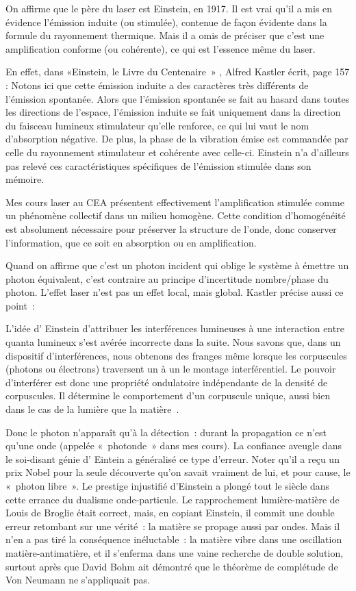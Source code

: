 \documentclass[a4paper,12pt]{article}
\begin{document}
On affirme que le père du laser est Einstein, en 1917. Il est vrai qu'il a mis en évidence l'émission induite (ou stimulée), contenue de façon évidente dans la formule du rayonnement thermique. Mais il a omis de préciser que c'est une amplification conforme (ou cohérente), ce qui est l'essence même du laser.

En effet, dans «Einstein, le Livre du Centenaire » \cite{French}, Alfred Kastler écrit, page 157 : Notons ici que cette émission induite a des caractères très différents de l'émission spontanée. Alors que l'émission spontanée se fait au hasard dans toutes les directions de l'espace, l'émission induite se fait uniquement dans la direction du faisceau lumineux stimulateur qu'elle renforce, ce qui lui vaut le nom d'absorption négative. De plus, la phase de la vibration émise est commandée par celle du rayonnement stimulateur et cohérente avec celle-ci. Einstein n'a d'ailleurs pas relevé ces caractéristiques spécifiques de l'émission stimulée dans son mémoire.

Mes cours laser au CEA présentent effectivement l'amplification stimulée comme un phénomène collectif dans un milieu homogène. Cette condition d'homogénéité est absolument nécessaire pour préserver la structure de l'onde, donc conserver l'information, que ce soit en absorption ou en amplification.

Quand on affirme que c'est un photon incident qui oblige le système à émettre un photon équivalent, c'est contraire au principe d'incertitude nombre/phase du photon. L'effet laser n'est pas un effet local, mais global. Kastler précise aussi ce point :

L'idée d' Einstein d'attribuer les interférences lumineuses à une interaction entre quanta lumineux s'est avérée incorrecte dans la suite. Nous savons que, dans un dispositif d'interférences, nous obtenons des franges même lorsque les corpuscules (photons ou électrons) traversent un à un le montage interférentiel. Le pouvoir d'interférer est donc une propriété ondulatoire indépendante de la densité de corpuscules. Il détermine le comportement d'un corpuscule unique, aussi bien dans le cas de la lumière que la matière .

Donc le photon n'apparaît qu'à la détection : durant la propagation ce n'est qu'une onde (appelée « photonde » dans mes cours). La confiance aveugle dans le soi-disant génie d' Eintein a généralisé ce type d'erreur. Noter qu'il a reçu un prix Nobel pour la seule découverte qu'on savait vraiment de lui, et pour cause, le « photon libre ». Le prestige injustifié d'Einstein a plongé tout le siècle dans cette errance du dualisme onde-particule. Le rapprochement lumière-matière de Louis de Broglie était correct, mais, en copiant Einstein, il commit une double erreur retombant sur une vérité : la matière se propage aussi par ondes. Mais il n'en a pas tiré la conséquence inéluctable : la matière vibre dans une oscillation matière-antimatière, et il s'enferma dans une vaine recherche de double solution, surtout après que David Bohm ait démontré que le théorème de complétude de Von Neumann ne s'appliquait pas.
\end{document}
